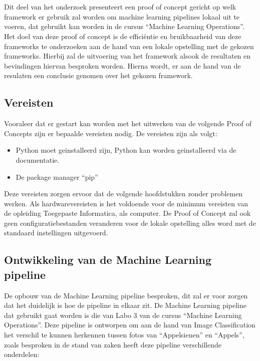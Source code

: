 \chapter{}%
\label{ch:PoC}

Dit deel van het onderzoek presenteert een proof of concept gericht op welk framework er gebruik zal worden om machine learning pipelines lokaal uit te voeren, dat gebruikt kan worden in de cursus ``Machine Learning Operations''.
Het doel van deze proof of concept is de efficiëntie en bruikbaarheid van deze frameworks te onderzoeken aan de hand van een lokale opstelling met de gekozen frameworks. Hierbij zal de uitvoering van het framework alsook de resultaten en bevindingen hiervan besproken worden.
Hierna wordt, er aan de hand van de resulaten een conclusie genomen over het gekozen framework.
\section{Vereisten}


Vooraleer dat er gestart kan worden met het uitwerken van de volgende Proof of Concepts zijn er bepaalde vereisten nodig.
De vereisten zijn als volgt:
\begin{itemize}
    \item Python moet geinstalleerd zijn, Python kan worden geinstalleerd via de documentatie.
    \item De package manager ``pip''
\end{itemize}
Deze vereisten zorgen ervoor dat de volgende hoofdstukken zonder problemen werken.
Als hardwarevereisten is het voldoende voor de minimum vereisten van de opleiding Toegepaste Informatica, als computer.
De Proof of Concept zal ook geen configuratiebestanden veranderen voor de lokale opstelling alles word met de standaard instellingen uitgevoerd.
\section{Ontwikkeling van de Machine Learning pipeline}

De opbouw van de Machine Learning pipeline besproken, dit zal er voor zorgen dat het duidelijk is hoe de pipeline in elkaar zit.
De Machine Learning pipeline dat gebruikt gaat worden is die van Labo 3 van de cursus ``Machine Learning Operations''. Deze pipeline is ontworpen om aan de hand van Image Classification het verschil te kunnen herkennen tussen fotos van ``Appelsienen'' en ``Appels'', zoals besproken in de stand van zaken heeft deze pipeline verschillende onderdelen:

